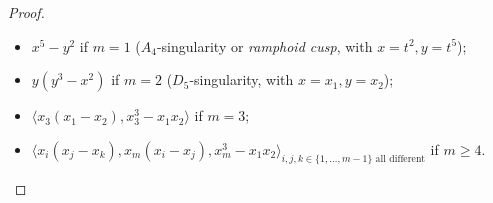 \documentclass{compositio}
\theoremstyle{plain}
\theoremstyle{definition}
\theoremstyle{remark}
\newtheorem{rem}[thm]{Remark}
\begin{document}
\begin{proof}
 \begin{itemize}
  \item $x^5-y^2$ if $m=1$ ($A_4$-singularity or \emph{ramphoid cusp}, with $x=t^2,y=t^5$);
  \item $y(y^3-x^2)$ if $m=2$ ($D_5$-singularity, with $x=x_1,y=x_2$);
  \item $\langle x_3(x_1-x_2),x_3^3-x_1x_2\rangle$ if $m=3$;
  \item $\langle x_i(x_j-x_k), x_m(x_i-x_j),x_m^3-x_1x_2\rangle_{i,j,k\in\{1,\ldots,m-1\}\text{ all different}}$ if $m\geq 4$.
 \end{itemize}
\end{proof}

\end{document}
